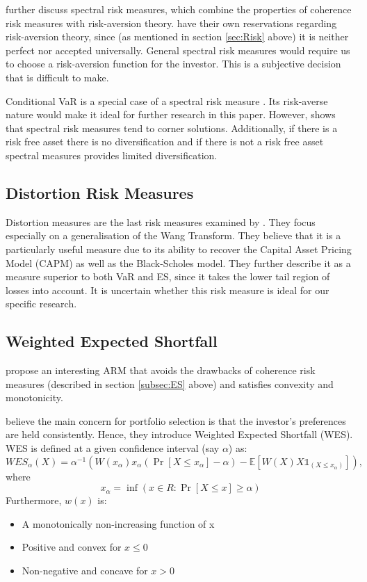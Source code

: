 \documentclass[12pt,a4paper]{article}
\newcommand{\bi}{\begin{itemize}}
\newcommand{\ei}{\end{itemize}}
\newcommand{\e}[1]{{\mathbb E}\left[ #1 \right]}
\begin{document}
\cite{dowd2006after} further discuss spectral risk measures, which combine the properties of coherence risk measures with risk-aversion theory. \cite{dowd2006after} have their own reservations regarding risk-aversion theory, since (as mentioned in section \ref{sec:Risk} above) it is neither perfect nor accepted universally. General spectral risk measures would require us to choose a risk-aversion function for the investor. This is a subjective decision that is difficult to make.

Conditional VaR is a special case of a spectral risk measure \citep{BRANDTNER20135526}. Its risk-averse nature would make it ideal for further research in this paper. However, \cite{BRANDTNER20135526} shows that spectral risk measures tend to corner solutions. Additionally, if there is a risk free asset there is no diversification and if there is not a risk free asset spectral measures provides limited diversification.

\subsection{Distortion Risk Measures}
\label{subsec:Distortion} 

Distortion measures are the last risk measures examined by \cite{dowd2006after}. They focus especially on a generalisation of the Wang Transform. They believe that it is a particularly useful measure due to its ability to recover the Capital Asset Pricing Model (CAPM) as well as the Black-Scholes model. They further describe it as a measure superior to both VaR and ES, since it takes the lower tail region of losses into account. It is uncertain whether this risk measure is ideal for our specific research.


\subsection{Weighted Expected Shortfall}
\label{subsec:WES}

\cite{CHEN20111777} propose an interesting ARM that avoids the drawbacks of coherence risk measures (described in section \ref{subsec:ES} above) and satisfies convexity and monotonicity.

\cite{CHEN20111777} believe the main concern for portfolio selection is that the investor's preferences are held consistently. Hence, they introduce Weighted Expected Shortfall (WES). WES is defined at a given confidence interval (say $\alpha$) as:
$$
WES_{\alpha}(X)= \alpha^{-1}(W(x_{\alpha})x_{\alpha}(\Pr[X \leq x_{\alpha}]-\alpha)-\e{W(X)X\mathbb{1}_{(X \leq x_{\alpha})}}),
$$ 
where 
$$ x_{\alpha} = \inf( {x \in R : \Pr[X \leq x] \geq \alpha })$$
Furthermore, $w(x)$ is:
\bi
\item A monotonically non-increasing function of x
\item Positive and convex for $x \leq 0 $
\item Non-negative and concave for $x>0 $
\ei 
\end{document}
